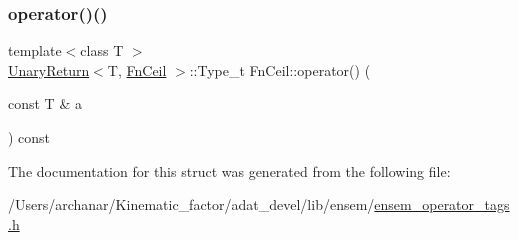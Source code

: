 \mbox{\label{structFnCeil_a9588c4122c2bacfe31df3cf25cb9d172}} 
\subsubsection{\texorpdfstring{operator()()}{operator()()}\hspace{0.1cm}{\footnotesize\ttfamily [2/2]}}
{\footnotesize\ttfamily template$<$class T $>$ \\
\mbox{\hyperlink{structUnaryReturn}{Unary\+Return}}$<$T, \mbox{\hyperlink{structFnCeil}{Fn\+Ceil}} $>$\+::Type\+\_\+t Fn\+Ceil\+::operator() (\begin{DoxyParamCaption}\item[{const T \&}]{a }\end{DoxyParamCaption}) const\hspace{0.3cm}{\ttfamily [inline]}}



The documentation for this struct was generated from the following file\+:\begin{DoxyCompactItemize}
\item 
/\+Users/archanar/\+Kinematic\+\_\+factor/adat\+\_\+devel/lib/ensem/\mbox{\hyperlink{lib_2ensem_2ensem__operator__tags_8h}{ensem\+\_\+operator\+\_\+tags.\+h}}\end{DoxyCompactItemize}
